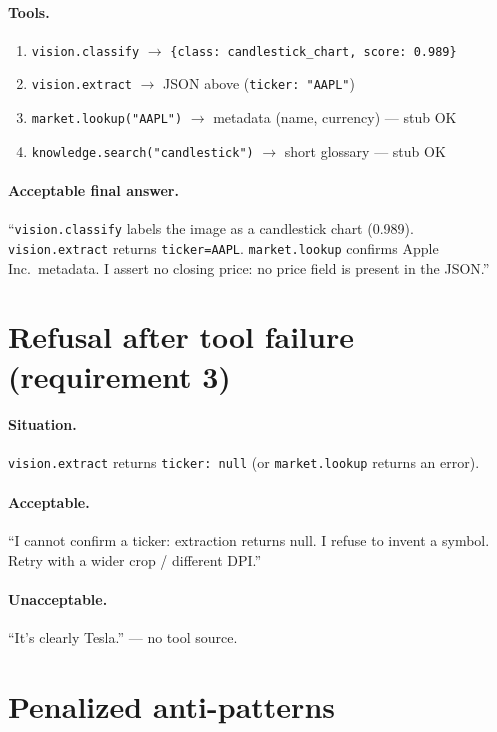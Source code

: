 \documentclass[11pt,a4paper]{article}
\begin{document}
\paragraph{Tools.}
\begin{enumerate}
  \item \texttt{vision.classify} $\rightarrow$ \texttt{\{class: candlestick\_chart, score: 0.989\}}
  \item \texttt{vision.extract} $\rightarrow$ JSON above (\texttt{ticker: "AAPL"})
  \item \texttt{market.lookup("AAPL")} $\rightarrow$ metadata (name, currency) --- stub OK
  \item \texttt{knowledge.search("candlestick")} $\rightarrow$ short glossary --- stub OK
\end{enumerate}

\paragraph{Acceptable final answer.}
``\texttt{vision.classify} labels the image as a candlestick chart (0.989).
\texttt{vision.extract} returns \texttt{ticker=AAPL}.
\texttt{market.lookup} confirms Apple Inc.\ metadata.
I assert no closing price: no price field is present in the JSON.''

\section{Refusal after tool failure (requirement 3)}

\paragraph{Situation.} \texttt{vision.extract} returns \texttt{ticker: null}
(or \texttt{market.lookup} returns an error).

\paragraph{Acceptable.}
``I cannot confirm a ticker: extraction returns null.
I refuse to invent a symbol. Retry with a wider crop / different DPI.''

\paragraph{Unacceptable.}
``It's clearly Tesla.'' --- no tool source.

\section{Penalized anti-patterns}
\end{document}
